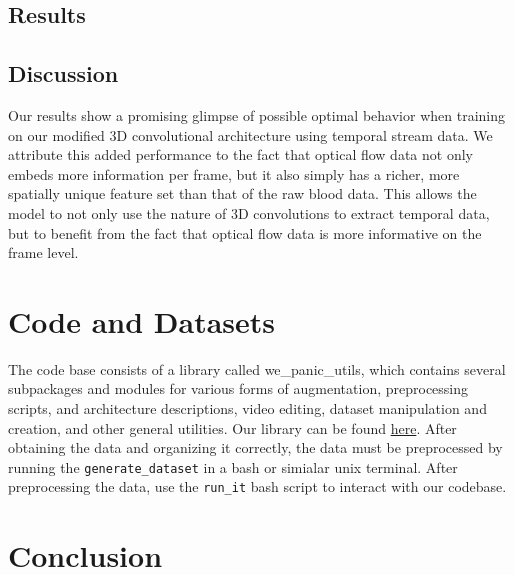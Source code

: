 \documentclass{article}
\begin{document}
\subsection[3.3]{Results}
\subsection[3.3] {Discussion}
Our results show a promising glimpse of possible optimal behavior when training on our modified 3D convolutional architecture using temporal stream data. We attribute this added performance to the fact that optical flow data not only embeds more information per frame, but it also simply has a richer, more spatially unique feature set than that of the raw blood data. This allows the model to not only use the nature of 3D convolutions to extract temporal data, but to benefit from the fact that optical flow data is more informative on the frame level.
\section[4]{Code and Datasets}
\noindent The code base consists of a library called we\_panic\_utils, which contains several subpackages and modules for various forms of augmentation, preprocessing scripts, and architecture descriptions, video editing, dataset manipulation and creation, and other general utilities. Our library can be found \href{https://github.com/danielberenberg/DeepLearning-BloodData}{here}. After obtaining the data and organizing it correctly, the data must be preprocessed by running the \texttt{generate\_dataset} in a bash or simialar unix terminal. After preprocessing the data, use the \texttt{run\_it} bash script to interact with our codebase.
\section[5]{Conclusion}

\end{document}
